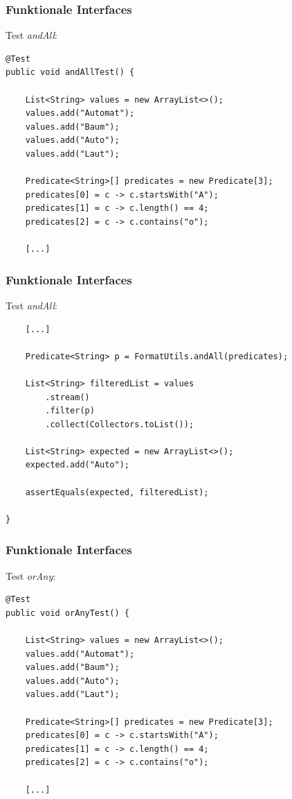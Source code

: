 \documentclass{beamer}
\begin{document}
\begin{frame}[fragile]
\frametitle{Funktionale Interfaces}

Test \textit{andAll}:

\lstset{basicstyle=\scriptsize}
\begin{lstlisting}
@Test
public void andAllTest() {

    List<String> values = new ArrayList<>();
    values.add("Automat");
    values.add("Baum");
    values.add("Auto");
    values.add("Laut");

    Predicate<String>[] predicates = new Predicate[3];
    predicates[0] = c -> c.startsWith("A");
    predicates[1] = c -> c.length() == 4;
    predicates[2] = c -> c.contains("o");

    [...]
\end{lstlisting}

\end{frame}

\begin{frame}[fragile]
\frametitle{Funktionale Interfaces}

Test \textit{andAll}:

\lstset{basicstyle=\scriptsize}
\begin{lstlisting}
    [...]

    Predicate<String> p = FormatUtils.andAll(predicates);

    List<String> filteredList = values
        .stream()
        .filter(p)
        .collect(Collectors.toList());

    List<String> expected = new ArrayList<>();
    expected.add("Auto");

    assertEquals(expected, filteredList);

}
\end{lstlisting}

\end{frame}

\begin{frame}[fragile]
\frametitle{Funktionale Interfaces}

Test \textit{orAny}:

\lstset{basicstyle=\scriptsize}
\begin{lstlisting}
@Test
public void orAnyTest() {

    List<String> values = new ArrayList<>();
    values.add("Automat");
    values.add("Baum");
    values.add("Auto");
    values.add("Laut");

    Predicate<String>[] predicates = new Predicate[3];
    predicates[0] = c -> c.startsWith("A");
    predicates[1] = c -> c.length() == 4;
    predicates[2] = c -> c.contains("o");

    [...]
\end{lstlisting}

\end{frame}
\end{document}
